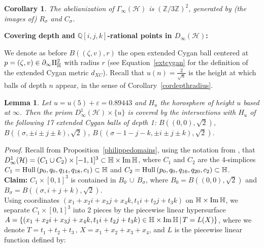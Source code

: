 \documentclass{article}[12pt]
\newcommand{\Z}{\mathbb{Z}}
\newcommand{\Q}{\mathbb{Q}}
\newcommand{\quat}{\mathbb{H}}
\newtheorem{cor}{Corollary}
\newtheorem{lem}{Lemma}%
\newcommand{\Pf}{{\em Proof}. }
\begin{document}
\begin{cor}\label{inftyabel} The abelianization of $\Gamma_{\infty}(\mathcal{H})$ is $(\Z/3\Z)^2$, generated by (the images of) $R_\sigma$ and $C_\sigma$.
\end{cor}

{\bf Covering depth and $\Q[i,j,k]$-rational points in $D_\infty(\mathcal{H})$:}

We denote as before $B\left((\zeta,v),r\right)$ the open extended Cygan ball centered at $p=(\zeta,v) \in \partial_\infty {\rm H}_\quat^2$ with radius $r$ (see Equation~\ref{extcygan} for the definition of the extended Cygan metric $d_{XC}$). Recall that $u(n)=\frac{2}{\sqrt{n}}$ is the height at which balls of depth $n$ appear, in the sense of Corollary~\ref{cordepthradius}. 

\begin{lem}\label{hurwitzcover} Let $u=u(5)+\varepsilon=0.89443$ and $H_u$ the horosphere of height $u$ based at $\infty$. Then the prism $D^1_\infty(\mathcal{H})\times \{ u \}$ is covered by the intersections with $H_u$ of the following 17 extended Cygan balls of depth 1:  $B\left((0,0),\sqrt{2}\right)$, $B\left((\sigma,\pm i \pm j \pm k),\sqrt{2}\right)$, $B\left((\sigma-1-j-k,\pm i \pm j \pm k),\sqrt{2}\right)$.
\end{lem}

\Pf Recall from Proposition~\ref{philippedomains}, using the notation from \cite{Ph}, that $D^1_\infty(\mathcal{H})=(C_1 \cup C_2) \times [-1,1]^3  \subset \mathbb{H} \times {\rm Im} \, \quat$, where $C_1$ and $C_2$ are the 4-simplices $C_1={\rm Hull}\left(p_0,q_0,q_{14},q_{18},c_1\right) \subset \mathbb{H}$ and $C_2={\rm Hull}\left(p_0,q_0, q_{16},q_{20},c_2\right) \subset \mathbb{H}$.\\

{\bf Claim:} $C_1 \times [0,1]^3$ is contained in $B_0 \, \cup \, B_\sigma$, where $B_0=B\left((0,0),\sqrt{2}\right)$ and $B_\sigma=B\left((\sigma,i+j+k),\sqrt{2}\right)$. \\


Using coordinates $(x_1+x_2i+x_3j+x_4k,t_1i+t_2j+t_3k)$ on $\quat \times {\rm Im}\, \quat$, we separate $C_1 \times [0,1]^3$ into 2 pieces by the piecewise linear hypersurface $A=\{(x_1+x_2i+x_3j+x_4k,t_1i+t_2j+t_3k) \in \quat \times {\rm Im}\, \quat \, | \, T= L(X)\}$, where we denote $T=t_1+t_2+t_3 \, , \, X=x_1+x_2+x_3+x_4$, and $L$ is the piecewise linear function defined by:
\end{document}
